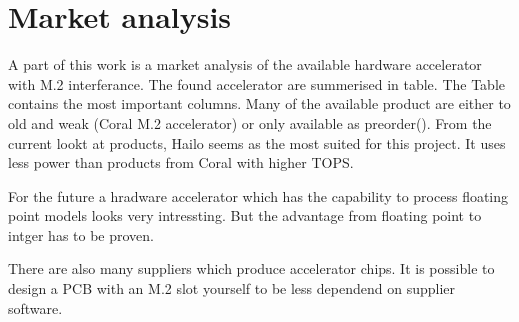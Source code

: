 \chapter{Market analysis}


A part of this work is a market analysis of the available hardware accelerator with M.2 interferance.
The found accelerator are summerised in table.
The Table contains the most important columns.
Many of the available product are either to old and weak (Coral M.2 accelerator) or only available as preorder().
From the current lookt at products, Hailo seems as the most suited for this project.
It uses less power than products from Coral with higher TOPS.

For the future a hradware accelerator which has the capability to process floating point models looks very intressting.
But the advantage from floating point to intger has to be proven.

There are also many suppliers which produce accelerator chips.
It is possible to design a PCB with an M.2 slot yourself to be less dependend on supplier software.



